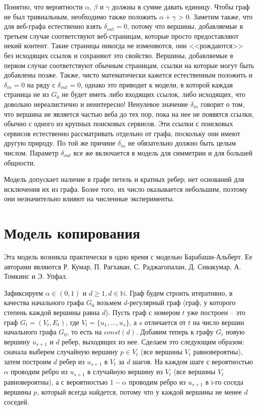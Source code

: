 \documentclass[14pt]{extreport}
\begin{document}
Понятно, что вероятности $\alpha$, $\beta$ и $\gamma$ должны в сумме давать единицу. Чтобы граф не был тривиальным, необходимо также положить $\alpha + \gamma$ > 0. Заметим также, что для веб-графа естественно взять $\delta_{out} = 0$, потому что вершины, добавляемые в третьем случае соответствуют веб-страницам, которые просто предоставляют некий контент. Такие страницы никогда не изменяются, они <<рождаются>> без исходящих ссылок и сохраняют это свойство. Вершины, добавляемые в первом случае соответствуют обычным страницам, ссылки на которые могут быть добавлены позже. Также, чисто математически кажется естественным положить и $\delta_{in} = 0$ на ряду с $\delta_{out} = 0$, однако это приводит к модели, в которой каждая страница не из $G_0$ не будет иметь либо входящих ссылок, либо исходящих, что довольно нереалистично и неинтересно! Ненулевое значение $\delta_{in}$ говорит о том, что вершина не является частью веба до тех пор, пока на нее не появятся ссылки, обычно с одного из крупных поисковых сервисов. Эти ссылки с поисковых сервисов естественно рассматривать отдельно от графа, поскольку они имеют другую природу. По той же причине $\delta_{in}$ не обязательно должно быть целым числом. Параметр $\delta_{out}$ все же включается в модель для симметрии и для большей общности.

Модель допускает наличие в графе петель и кратных ребер; нет оснований для исключения их из графа. Более того, их число оказывается небольшим, поэтому они незначительно влияют на численные эксперименты. 

\section{Модель копирования}
Эта модель возникла практически в одно время с моделью Барабаши-Альберт. Ее авторами являются Р. Кумар, П. Рагхаван, С. Раджагопалан, Д. Сивакумар, А. Томкинс и Э. Упфал.

Зафиксируем $\alpha \in (0,1)$ и $d \ge 1, d \in \mathbb{N}$. Граф будем строить итеративно, в качества начального графа $G_0$ возьмем $d$-регулярный граф (граф, у которого степень каждой вершины равна $d$). Пусть граф с номером $t$ уже построен -- это граф $G_t = (V_t, E_t)$, где $V_t = \{u_1, \dots, u_s\}$, а $s$ отличается от $t$ на число вершин начального графа $G_0$, то есть на $const(d)$. Добавим теперь к графу $G_t$ новую вершину $u_{s+1}$ и $d$ ребер, выходящих из нее. Сделаем это следующим образом: сначала выберем случайную вершину $p \in V_t$ (все вершины $V_t$ равновероятны), затем построим $d$ ребер из $u_{s+1}$ в $V_t$ за $d$ шагов. На каждом шаге с вероятностью $\alpha$ проводим ребро из $u_{s+1}$ в случайную вершину из $V_t$ (все вершины $V_t$ равновероятны), а с вероятностью $1-\alpha$ проводим ребро из $u_{s+1}$ в i-го соседа вершины $p$, который всегда найдется, потому что у каждой вершины не менее $d$ соседей. 
\end{document}
